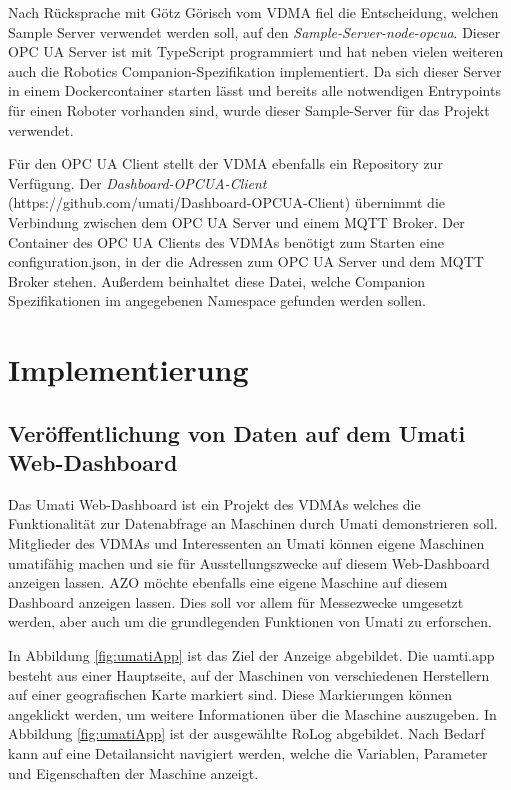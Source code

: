 \documentclass[a4paper, 12pt, oneside, toc=listofnumbered, bibliography=totoc]{scrbook}
\begin{document}
		Nach Rücksprache mit Götz Görisch vom VDMA fiel die Entscheidung, welchen Sample Server verwendet werden soll, auf den \textit{Sample-Server-node-opcua}. Dieser OPC UA Server ist mit TypeScript programmiert und hat neben vielen weiteren auch die Robotics Companion-Spezifikation implementiert. Da sich dieser Server in einem Dockercontainer starten lässt und bereits alle notwendigen Entrypoints für einen Roboter vorhanden sind, wurde dieser Sample-Server für das Projekt verwendet.
		
		Für den OPC UA Client stellt der VDMA ebenfalls ein Repository zur Verfügung. Der \textit{Dashboard-OPCUA-Client} (https://github.com/umati/Dashboard-OPCUA-Client) übernimmt die Verbindung zwischen dem OPC UA Server und einem MQTT Broker. Der Container des OPC UA Clients des VDMAs benötigt zum Starten eine configuration.json, in der die Adressen zum OPC UA Server und dem MQTT Broker stehen. Außerdem beinhaltet diese Datei, welche Companion Spezifikationen im angegebenen Namespace gefunden werden sollen. 
	
\chapter{Implementierung}\label{ch:Implementierung}
	
	\section{Veröffentlichung von Daten auf dem Umati Web-Dashboard}\label{ch:Implementierung-Web}
		
		Das Umati Web-Dashboard ist ein Projekt des VDMAs welches die Funktionalität zur Datenabfrage an Maschinen durch Umati demonstrieren soll. Mitglieder des VDMAs und Interessenten an Umati können eigene Maschinen umatifähig machen und sie für Ausstellungszwecke auf diesem Web-Dashboard anzeigen lassen. AZO möchte ebenfalls eine eigene Maschine auf diesem Dashboard anzeigen lassen. Dies soll vor allem für Messezwecke umgesetzt werden, aber auch um die grundlegenden Funktionen von Umati zu erforschen.
		
		In Abbildung \ref{fig:umatiApp} ist das Ziel der Anzeige abgebildet. Die uamti.app besteht aus einer Hauptseite, auf der Maschinen von verschiedenen Herstellern auf einer geografischen Karte markiert sind. Diese Markierungen können angeklickt werden, um weitere Informationen über die Maschine auszugeben. In Abbildung \ref{fig:umatiApp} ist der ausgewählte RoLog abgebildet. Nach Bedarf kann auf eine Detailansicht navigiert werden, welche die Variablen, Parameter und Eigenschaften der Maschine anzeigt.
		
\end{document}
